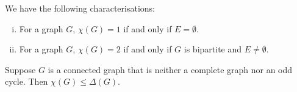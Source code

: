 
\begin{trditev}
We have the following characterisations:

\begin{enumerate}[i)]
\item For a graph $G$, $\chi(G) = 1$ if and only if
$E = \emptyset$.
\item For a graph $G$, $\chi(G) = 2$ if and only if $G$ is
bipartite and $E \ne \emptyset$.
\end{enumerate}
\end{trditev}

\obvs

\begin{izrek}[Brooks]
Suppose $G$ is a connected graph that is neither a complete graph
nor an odd cycle. Then $\chi(G) \leq \Delta(G)$.
\end{izrek}

